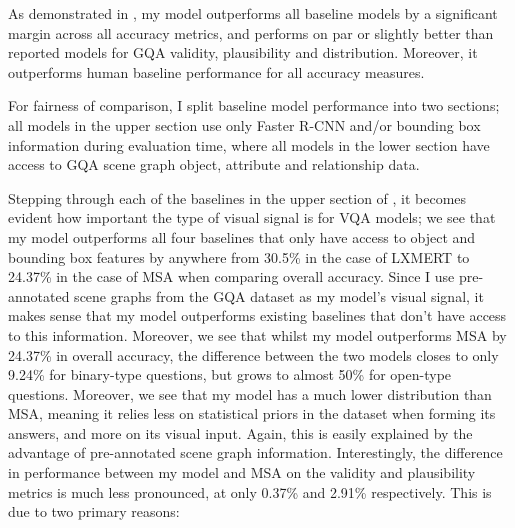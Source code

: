 As demonstrated in \tableautorefname{ \ref{table:performance_comparison}}, my model outperforms all baseline models by a significant margin across all accuracy metrics, and performs on par or slightly better than reported models for GQA validity, plausibility and distribution. Moreover, it outperforms human baseline performance for all accuracy measures.

For fairness of comparison, I split baseline model performance into two sections; all models in the upper section use only Faster R-CNN and/or bounding box information during evaluation time, where all models in the lower section have access to GQA scene graph object, attribute and relationship data.

Stepping through each of the baselines in the upper section of \tableautorefname{ \ref{table:performance_comparison}}, it becomes evident how important the type of visual signal is for VQA models; we see that my model outperforms all four baselines that only have access to object and bounding box features by anywhere from 30.5\% in the case of LXMERT \cite{tan2019lxmert} to 24.37\% in the case of MSA \cite{farazi2020attention} when comparing overall accuracy. Since I use pre-annotated scene graphs from the GQA dataset as my model's visual signal, it makes sense that my model outperforms existing baselines that don't have access to this information. Moreover, we see that whilst my model outperforms MSA by 24.37\% in overall accuracy, the difference between the two models closes to only 9.24\% for binary-type questions, but grows to almost 50\% for open-type questions. Moreover, we see that my model has a much lower distribution than MSA, meaning it relies less on statistical priors in the dataset when forming its answers, and more on its visual input. Again, this is easily explained by the advantage of pre-annotated scene graph information. Interestingly, the difference in performance between my model and MSA on the validity and plausibility metrics is much less pronounced, at only 0.37\% and 2.91\% respectively. This is due to two primary reasons:

